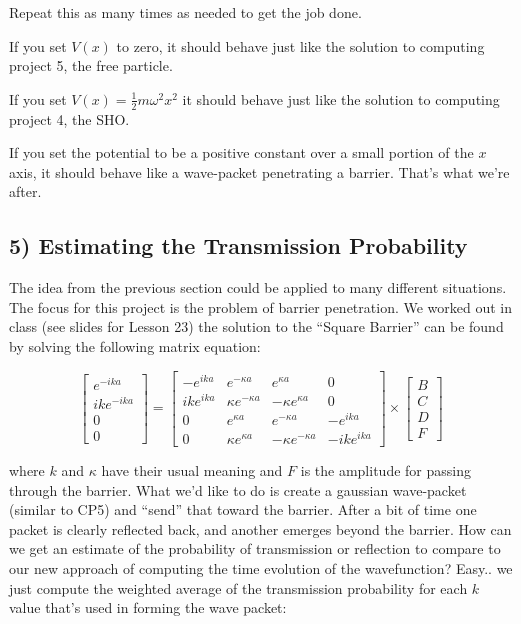 \documentclass[11pt]{article} %
\begin{document}
Repeat this as many times as needed to get the job done.

If you set $V(x)$ to zero, it should behave just like the solution to computing project 5, the free particle.

If you set $V(x) = \frac{1}{2}m\omega^2 x^2$ it should behave just like the solution to computing project 4, the SHO.

If you set the potential to be a positive constant over a small portion of the $x$ axis, it should behave like a wave-packet penetrating a barrier. That's what we're after.

\subsection*{5) Estimating the Transmission Probability}

The idea from the previous section could be applied to many different situations. The focus for this project is the problem of barrier penetration. We worked out in class (see slides for Lesson 23) the solution to the ``Square Barrier'' can be found by solving the following matrix equation:

\begin{equation}
\left[ \begin{array}{c} e^{-ika} \\ ike^{-ika} \\ 0 \\ 0 \end{array} \right] = \begin{bmatrix} -e^{ika} & e^{-\kappa a} & e^{\kappa a} & 0 \\ ik e^{ika} & \kappa e^{-\kappa a} & -\kappa e^{\kappa a} & 0\\ 0 & e^{\kappa a} & e^{-\kappa a} & - e^{ika} \\ 0 & \kappa e^{\kappa a} & -\kappa e^{-\kappa a} & -ik e^{ika} \end{bmatrix} \times \left[ \begin{array}{c} B \\ C \\ D \\ F \end{array} \right]
\end{equation}

where $k$ and $\kappa$ have their usual meaning and $F$ is the amplitude for passing through the barrier.  What we'd like to do is create a gaussian wave-packet (similar to CP5) and ``send'' that toward the barrier. After a bit of time one packet is clearly reflected back, and another emerges beyond the barrier. How can we get an estimate of the probability of transmission or reflection to compare to our new approach of computing the time evolution of the wavefunction? Easy.. we just compute the weighted average of the transmission probability for each $k$ value that's used in forming the wave packet:
\end{document}
